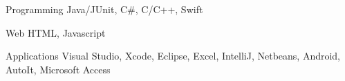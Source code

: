 


\begin{cvskills}


\cvskill
{Programming} %
{Java/JUnit, C\#, C/C++, Swift} %


\cvskill
{Web} %
{HTML, Javascript} %


\cvskill
{Applications} %
{Visual Studio, Xcode, Eclipse, Excel, IntelliJ, Netbeans, Android, AutoIt, Microsoft Access} %


\end{cvskills}
